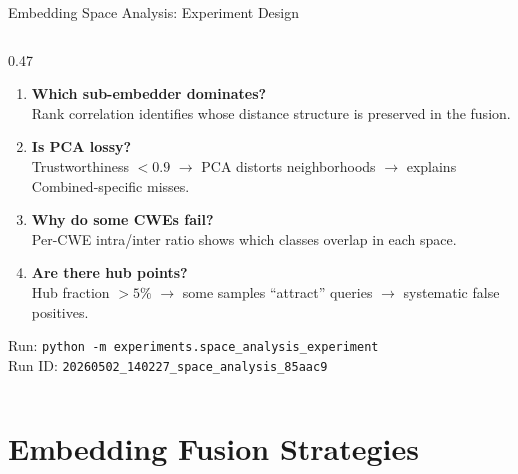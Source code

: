 \documentclass[aspectratio=169,10pt]{beamer}
\begin{document}
\begin{frame}{Embedding Space Analysis: Experiment Design}
\begin{columns}[T]
\begin{column}{0.47\textwidth}
{\begin{enumerate}
    \item \textbf{Which sub-embedder dominates?}\\
      Rank correlation identifies whose distance structure is preserved in the fusion.

    \item \textbf{Is PCA lossy?}\\
      Trustworthiness $< 0.9$ $\to$ PCA distorts neighborhoods $\to$ explains Combined-specific misses.

    \item \textbf{Why do some CWEs fail?}\\
      Per-CWE intra/inter ratio shows which classes overlap in each space.

    \item \textbf{Are there hub points?}\\
      Hub fraction $> 5\%$ $\to$ some samples ``attract'' queries $\to$ systematic false positives.
  \end{enumerate}}

  \vspace{0.4em}
  {\scriptsize\color{black!55}
  Run: \texttt{python -m experiments.space\_analysis\_experiment}\\
  Run ID: \texttt{20260502\_140227\_space\_analysis\_85aac9}}

\end{column}
\end{columns}
\end{frame}


\section{Embedding Fusion Strategies}
\end{document}
